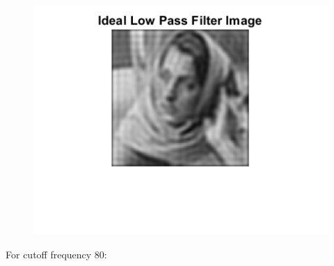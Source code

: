\documentclass{article}
\begin{document}
\begin{figure}[!htb]
\begin{minipage}[b]{0.3\textwidth}
    \end{minipage}
    \begin{minipage}[b]{0.3\textwidth}
        \includegraphics[width=\textwidth]{Filtered_Image.png}
    \end{minipage}
\end{figure}

For cutoff frequency 80:
\end{document}
